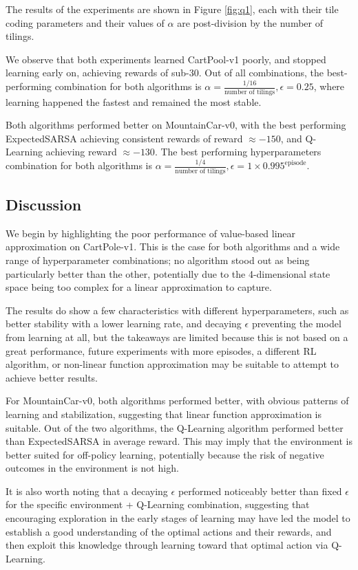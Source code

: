 \documentclass{article}
\begin{document}
The results of the experiments are shown in Figure \ref{fig:q1},  each with their tile coding
parameters and their values of $\alpha$ are post-division by the number of tilings.

We observe that both experiments learned CartPool-v1 poorly, and stopped learning
early on, achieving rewards of sub-$30$. Out of all combinations, the best-performing combination for both
algorithms is $\alpha = \frac{1/16}{\text{number of tilings}}, \epsilon = 0.25$, where learning
happened the fastest and remained the most stable.

Both algorithms performed better on MountainCar-v0, with the best performing ExpectedSARSA achieving consistent rewards of
reward $\approx -150$, and Q-Learning achieving reward $\approx -130$. The best performing hyperparameters
combination for both algorithms is $\alpha = \frac{1/4}{\text{number of tilings}}, \epsilon = 1\times
0.995^{\text{episode}}$.

\subsection{Discussion}
We begin by highlighting the poor performance of value-based linear approximation on CartPole-v1. This is
the case for both algorithms and a wide range of hyperparameter combinations; no algorithm
stood out as being particularly better than the other, potentially due to the 4-dimensional state space being too complex for a linear approximation to capture.

The results do show a few characteristics with different hyperparameters, such as better stability with a
lower learning rate, and decaying $\epsilon$ preventing the model from learning at all, but
the takeaways are limited because this is not based on a great performance,
future experiments with more episodes, a different RL algorithm, or non-linear function approximation
may be suitable to attempt to achieve better results.

For MountainCar-v0, both algorithms performed better, with obvious patterns of learning and
stabilization, suggesting that linear function approximation is suitable.
Out of the two algorithms, the Q-Learning algorithm performed better than ExpectedSARSA in average reward.
This may imply that the environment is better suited for off-policy learning, potentially
because the risk of negative outcomes in the environment is not high.

It is also worth noting that a decaying $\epsilon$ performed noticeably better than fixed $\epsilon$
for the specific environment + Q-Learning combination, suggesting that encouraging exploration
in the early stages of learning may have led the model to establish a good understanding of the
optimal actions and their rewards, and then exploit this knowledge through learning toward that
optimal action via Q-Learning.
\end{document}
